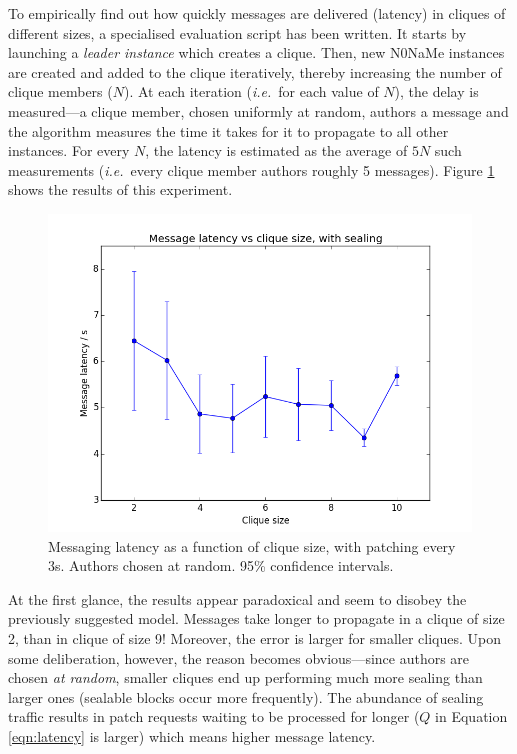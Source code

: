 \documentclass[a4paper, twoside, 12pt]{report}
\newcommand{\funkytt}{\fontfamily{AnonymousPro}\selectfont}
\begin{document}
To empirically find out how quickly messages are delivered (latency) in cliques of different sizes, a specialised evaluation script has been written. It starts by launching a \emph{leader instance} which creates a clique. Then, new {\funkytt N0NaMe} instances are created and added to the clique iteratively, thereby increasing the number of clique members ($N$). At each iteration (\textit{i.e.}~for each value of $N$), the delay is measured---a clique member, chosen uniformly at random, authors a message and the algorithm measures the time it takes for it to propagate to all other instances. For every $N$, the latency is estimated as the average of $5N$ such measurements (\textit{i.e.}~every clique member authors roughly 5 messages). Figure \ref{fig:latency_vs_N} shows the results of this experiment.

\restoregeometry

\begin{figure}[H]
    \captionsetup{width=0.8\textwidth}
    \centering
    \includegraphics[width=0.65\linewidth]{pics/eval/latency_vs_N_seal.png}
    \caption{\label{fig:latency_vs_N} Messaging latency as a function of clique size, with patching every 3s. Authors chosen at random. 95\% confidence intervals.}
\end{figure}

At the first glance, the results appear paradoxical and seem to disobey the previously suggested model. Messages take longer to propagate in a clique of size 2, than in clique of size 9! Moreover, the error is larger for smaller cliques. Upon some deliberation, however, the reason becomes obvious---since authors are chosen \emph{at random}, smaller cliques end up performing much more sealing than larger ones (sealable blocks occur more frequently). The abundance of sealing traffic results in patch requests waiting to be processed for longer ($Q$ in Equation \ref{eqn:latency} is larger) which means higher message latency. \\
\end{document}
